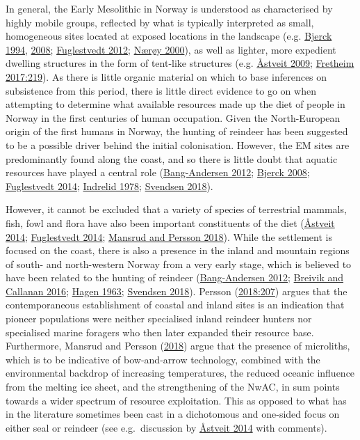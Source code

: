 \documentclass[
  12pt,
  a4paper,
  oneside]{book}
\begin{document}
In general, the Early Mesolithic in Norway is understood as characterised by highly mobile groups, reflected by what is typically interpreted as small, homogeneous sites located at exposed locations in the landscape (e.g. \protect\hyperlink{ref-bjerck1994}{Bjerck 1994}, \protect\hyperlink{ref-bjerck2008}{2008}; \protect\hyperlink{ref-fuglestvedt2012}{Fuglestvedt 2012}; \protect\hyperlink{ref-nuxe6ruxf8y2000}{Nærøy 2000}), as well as lighter, more expedient dwelling structures in the form of tent-like structures (e.g. \protect\hyperlink{ref-uxe5stveit2009}{Åstveit 2009}; \protect\hyperlink{ref-fretheim2017}{Fretheim 2017:219}). As there is little organic material on which to base inferences on subsistence from this period, there is little direct evidence to go on when attempting to determine what available resources made up the diet of people in Norway in the first centuries of human occupation. Given the North-European origin of the first humans in Norway, the hunting of reindeer has been suggested to be a possible driver behind the initial colonisation. However, the EM sites are predominantly found along the coast, and so there is little doubt that aquatic resources have played a central role (\protect\hyperlink{ref-bang-andersen2012}{Bang-Andersen 2012}; \protect\hyperlink{ref-bjerck2008}{Bjerck 2008}; \protect\hyperlink{ref-fuglestvedt2014}{Fuglestvedt 2014}; \protect\hyperlink{ref-indrelid1978}{Indrelid 1978}; \protect\hyperlink{ref-svendsen2018}{Svendsen 2018}).

However, it cannot be excluded that a variety of species of terrestrial mammals, fish, fowl and flora have also been important constituents of the diet (\protect\hyperlink{ref-uxe5stveit2014}{Åstveit 2014}; \protect\hyperlink{ref-fuglestvedt2014}{Fuglestvedt 2014}; \protect\hyperlink{ref-mansrud2018}{Mansrud and Persson 2018}). While the settlement is focused on the coast, there is also a presence in the inland and mountain regions of south- and north-western Norway from a very early stage, which is believed to have been related to the hunting of reindeer (\protect\hyperlink{ref-bang-andersen2012}{Bang-Andersen 2012}; \protect\hyperlink{ref-breivik2016}{Breivik and Callanan 2016}; \protect\hyperlink{ref-hagen1963}{Hagen 1963}; \protect\hyperlink{ref-svendsen2018}{Svendsen 2018}). Persson (\protect\hyperlink{ref-persson2018}{2018:207}) argues that the contemporaneous establishment of coastal and inland sites is an indication that pioneer populations were neither specialised inland reindeer hunters nor specialised marine foragers who then later expanded their resource base. Furthermore, Mansrud and Persson (\protect\hyperlink{ref-mansrud2018}{2018}) argue that the presence of microliths, which is to be indicative of bow-and-arrow technology, combined with the environmental backdrop of increasing temperatures, the reduced oceanic influence from the melting ice sheet, and the strengthening of the NwAC, in sum points towards a wider spectrum of resource exploitation. This as opposed to what has in the literature sometimes been cast in a dichotomous and one-sided focus on either seal or reindeer (see e.g.~discussion by \protect\hyperlink{ref-uxe5stveit2014}{Åstveit 2014} with comments).
\end{document}
